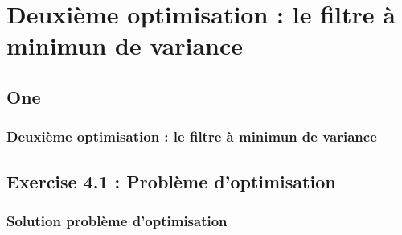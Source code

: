 \documentclass[11pt]{beamer}
\begin{document}
\section{Deuxième optimisation : le filtre à minimun de variance}
\begin{frame}
	\subsection{One}
	\frametitle{Deuxième optimisation : le filtre à minimun de variance}

	
\end{frame}
\subsection{Exercise 4.1 : Problème d'optimisation}
\begin{frame}

	\frametitle{Solution problème d'optimisation}
\end{frame}
\end{document}
